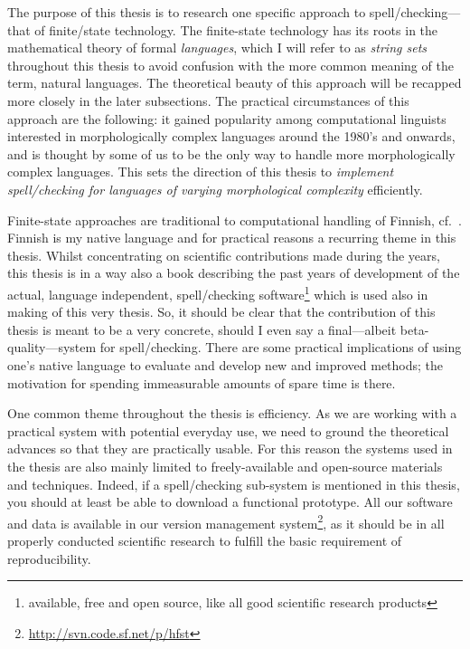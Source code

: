 \documentclass[officiallayout]{unihelcompling}
\begin{document}
The purpose of this thesis is to research one specific approach to
spell\-/checking---that of finite\-/state technology. The finite-state technology
has its roots in the mathematical theory of formal \emph{languages}, which I
will refer to as \emph{string sets} throughout this thesis to avoid confusion
with the more common meaning of the term, natural languages. The theoretical
beauty of this approach will be recapped more closely in the later subsections.
The practical circumstances of this approach are the following: it gained
popularity among computational linguists interested in morphologically complex
languages around the 1980's and onwards, and is thought by some of us to be the
only way to handle more morphologically complex languages. This sets the
direction of this thesis to \emph{implement spell\-/checking for languages of
varying morphological complexity} efficiently.

Finite-state approaches are traditional to computational handling of Finnish,
cf.~\citet{koskenniemi1983twolevel}. Finnish is my native language and for
practical reasons a recurring theme in this thesis. Whilst concentrating on
scientific contributions made during the years, this thesis is in a way also a
book describing the past years of development of the actual, language
independent, spell\-/checking software\footnote{available, free and open source,
like all good scientific research products} which is used also in making of
this very thesis. So, it should be clear that the contribution of this thesis
is meant to be a very concrete, should I even say a final---albeit
beta-quality---system for spell\-/checking.  There are some practical
implications of using one's native language to evaluate and develop new and
improved methods; the motivation for spending immeasurable amounts of spare
time is there.

One common theme throughout the thesis is efficiency. As we are working with a
practical system with potential everyday use, we need to ground the theoretical
advances so that they are practically usable. For this reason the systems used
in the thesis are also mainly limited to freely-available and open-source
materials and techniques. Indeed, if a spell\-/checking sub-system is mentioned
in this thesis, you should at least be able to download a functional prototype.
All our software and data is available in our version management
system\footnote{\url{http://svn.code.sf.net/p/hfst}}, as it should be in all
properly conducted scientific research to fulfill the basic requirement of
reproducibility.
\end{document}
